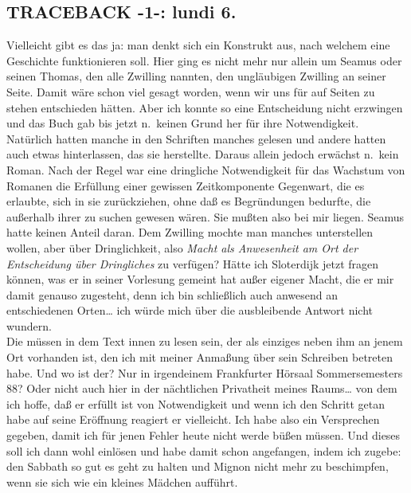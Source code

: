 \documentclass[
]{article}
\author{}
\date{\vspace{-2.5em}}
\begin{document}
\subsection{TRACEBACK -1-: lundi 6.}\label{traceback--1--lundi-6.}

Vielleicht gibt es das ja: man denkt sich ein Konstrukt aus, nach
welchem eine Geschichte funktionieren soll. Hier ging es nicht mehr nur
allein um Seamus oder seinen Thomas, den alle Zwilling nannten, den
ungläubigen Zwilling an seiner Seite. Damit wäre schon viel gesagt
worden, wenn wir uns für auf Seiten zu stehen entschieden hätten. Aber
ich konnte so eine Entscheidung nicht erzwingen und das Buch gab bis
jetzt n.~keinen Grund her für ihre Notwendigkeit. Natürlich hatten
manche in den Schriften manches gelesen und andere hatten auch etwas
hinterlassen, das sie herstellte. Daraus allein jedoch erwächst n.~kein
Roman. Nach der Regel war eine dringliche Notwendigkeit für das Wachstum
von Romanen die Erfüllung einer gewissen Zeitkomponente Gegenwart, die
es erlaubte, sich in sie zurückziehen, ohne daß es Begründungen
bedurfte, die außerhalb ihrer zu suchen gewesen wären. Sie mußten also
bei mir liegen. Seamus hatte keinen Anteil daran. Dem Zwilling mochte
man manches unterstellen wollen, aber über Dringlichkeit, also
\emph{Macht als Anwesenheit am Ort der Entscheidung über Dringliches }zu
verfügen? Hätte ich Sloterdijk jetzt fragen können, was er in seiner
Vorlesung gemeint hat außer eigener Macht, die er mir damit genauso
zugesteht, denn ich bin schließlich auch anwesend an entschiedenen
Orten\ldots{} ich würde mich über die ausbleibende Antwort nicht
wundern.\\
Die müssen in dem Text innen zu lesen sein, der als einziges neben ihm
an jenem Ort vorhanden ist, den ich mit meiner Anmaßung über sein
Schreiben betreten habe. Und wo ist der? Nur in irgendeinem Frankfurter
Hörsaal Sommersemesters 88? Oder nicht auch hier in der nächtlichen
Privatheit meines Raums\ldots{} von dem ich hoffe, daß er erfüllt ist
von Notwendigkeit und wenn ich den Schritt getan habe auf seine
Eröffnung reagiert er vielleicht. Ich habe also ein Versprechen gegeben,
damit ich für jenen Fehler heute nicht werde büßen müssen. Und dieses
soll ich dann wohl einlösen und habe damit schon angefangen, indem ich
zugebe: den Sabbath so gut es geht zu halten und Mignon nicht mehr zu
beschimpfen, wenn sie sich wie ein kleines Mädchen aufführt.
\end{document}
